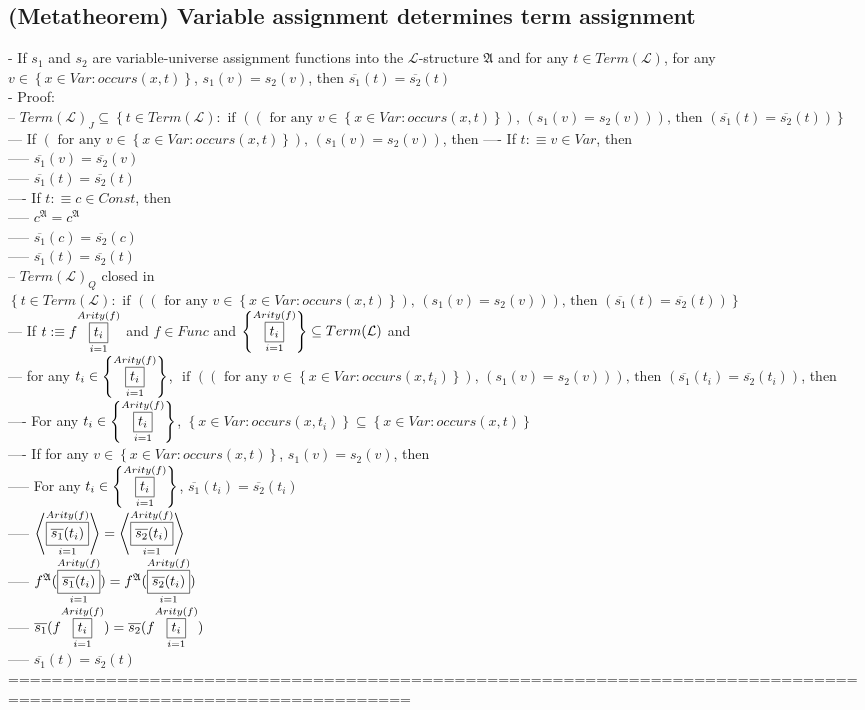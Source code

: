 \documentclass{book}
\newcommand{\is}{:\equiv}
\newcommand{\txtforall}[2]{\left(\text{ for any }#1\right)\text{, }\left(#2\right)}
\newcommand{\txtif}[2]{\text{ if }\left(#1\right)\text{, then }\left(#2\right)}
\newcommand{\occurs}[2]{occurs(#1, #2)}
\newcommand{\means}[2]{#1^{#2}}
\newcommand{\extend}[1]{\overline{#1}}
\newcommand{\set}[1]{\left\{ #1 \right\}}
\newcommand{\seq}[1]{\left\langle #1 \right\rangle}
\newcommand{\vdc}[3]{\underset{#2}{\overset{#3}{\fbox{$#1$}}}}
\begin{document}
\subsection{(Metatheorem) Variable assignment determines term assignment} %
	- If $s_1$ and $s_2$ are variable-universe assignment functions into the $\mathcal{L}$-structure $\mathfrak{A}$ and for any $t \in Term(\mathcal{L})$, for any $v \in \set{x \in Var: \occurs{x}{t}}$, $s_1(v) = s_2(v)$, then $\extend{s_1}(t) = \extend{s_2}(t)$ \\
	- Proof: \\
		-- $Term(\mathcal{L})_J \subseteq \set{t \in Term(\mathcal{L}): \txtif{\txtforall{v \in \set{x \in Var: \occurs{x}{t}}}{s_1(v) = s_2(v)}}{\extend{s_1}(t) = \extend{s_2}(t)}}$ \\
			--- If $\txtforall{v \in \set{x \in Var: \occurs{x}{t}}}{s_1(v) = s_2(v)}$, then  
				---- If $t \is v \in Var$, then \\
					----- $\extend{s_1}(v) = \extend{s_2}(v)$ \\
					----- $\extend{s_1}(t) = \extend{s_2}(t)$ \\
				---- If $t \is c \in Const$, then \\
					----- $\means{c}{\mathfrak{A}} = \means{c}{\mathfrak{A}}$ \\
					----- $\extend{s_1}(c) = \extend{s_2}(c)$ \\
				----- $\extend{s_1}(t) = \extend{s_2}(t)$ \\
		-- $Term(\mathcal{L})_Q$ closed in $\set{t \in Term(\mathcal{L}): \txtif{\txtforall{v \in \set{x \in Var: \occurs{x}{t}}}{s_1(v) = s_2(v)}}{\extend{s_1}(t) = \extend{s_2}(t)}}$ \\
			--- If $t \is f \vdc{t_i}{i=1}{Arity(f)}$ and $f \in Func$ and $\set{\vdc{t_i}{i=1}{Arity(f)}} \subseteq Term(\mathcal{L})$ and \\
			--- for any $t_i \in \set{\vdc{t_i}{i=1}{Arity(f)}}$, $\txtif{\txtforall{v \in \set{x \in Var: \occurs{x}{t_i}}}{s_1(v) = s_2(v)}}{\extend{s_1}(t_i) = \extend{s_2}(t_i)}$, then \\
				---- For any $t_i \in \set{\vdc{t_i}{i=1}{Arity(f)}}$, $\set{x \in Var: \occurs{x}{t_i}} \subseteq \set{x \in Var: \occurs{x}{t}}$ \\ 
				---- If for any $v \in \set{x \in Var: \occurs{x}{t}}$, $s_1(v) = s_2(v)$, then \\
					----- For any $t_i \in \set{\vdc{t_i}{i=1}{Arity(f)}}$, $\extend{s_1}(t_i) = \extend{s_2}(t_i)$ \\
					----- $\seq{\vdc{\extend{s_1}(t_i)}{i=1}{Arity(f)}} = \seq{\vdc{\extend{s_2}(t_i)}{i=1}{Arity(f)}}$ \\
					----- $\means{f}{\mathfrak{A}}(\vdc{\extend{s_1}(t_i)}{i=1}{Arity(f)}) = \means{f}{\mathfrak{A}}(\vdc{\extend{s_2}(t_i)}{i=1}{Arity(f)})$ \\
					----- $\extend{s_1}(f \vdc{t_i}{i=1}{Arity(f)}) = \extend{s_2}(f \vdc{t_i}{i=1}{Arity(f)})$ \\
					----- $\extend{s_1}(t) = \extend{s_2}(t)$ \\
	===================================================================================================================
\end{document}
